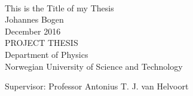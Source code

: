 
\thispagestyle{empty}
\mbox{}\\[6pc]
\begin{center}
\Huge{This is the Title of my Thesis}\\[2pc]

\Large{Johannes Bogen}\\[1pc]
\large{December 2016}\\[2pc]

PROJECT THESIS\\
Department of Physics\\
Norwegian University of Science and Technology
\end{center}
\vfill

\noindent Supervisor: Professor Antonius T. J. van Helvoort


